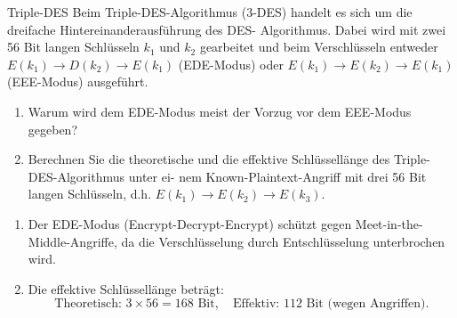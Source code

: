 \documentclass{article}
\begin{document}
\begin{exercise}{Triple-DES}
  Beim Triple-DES-Algorithmus (3-DES) handelt es sich um die dreifache Hintereinanderausführung des DES-
  Algorithmus. Dabei wird mit zwei 56 Bit langen Schlüsseln $ k_1 $ und $ k_2 $ gearbeitet und beim Verschlüsseln
  entweder $ E(k_1) \to D(k_2) \to E(k_1) $ (EDE-Modus) oder $ E(k_1) \to E(k_2) \to E(k_1) $ (EEE-Modus) ausgeführt.
  \begin{enumerate}
    \item Warum wird dem EDE-Modus meist der Vorzug vor dem EEE-Modus gegeben?
    \item Berechnen Sie die theoretische und die effektive Schlüssellänge des Triple-DES-Algorithmus unter ei-
    nem Known-Plaintext-Angriff mit drei 56 Bit langen Schlüsseln, d.h. $ E(k_1) \to E(k_2) \to E(k_3) $.
  \end{enumerate}

  \begin{solution}
    \begin{enumerate}
        \item Der EDE-Modus (Encrypt-Decrypt-Encrypt) schützt gegen Meet-in-the-Middle-Angriffe, da die Verschlüsselung durch Entschlüsselung unterbrochen wird.
        \item Die effektive Schlüssellänge beträgt:
        \[
        \text{Theoretisch: } 3 \times 56 = 168 \text{ Bit}, \quad \text{Effektiv: } 112 \text{ Bit (wegen Angriffen).}
        \]
    \end{enumerate}
  \end{solution}
\end{exercise}
\end{document}
